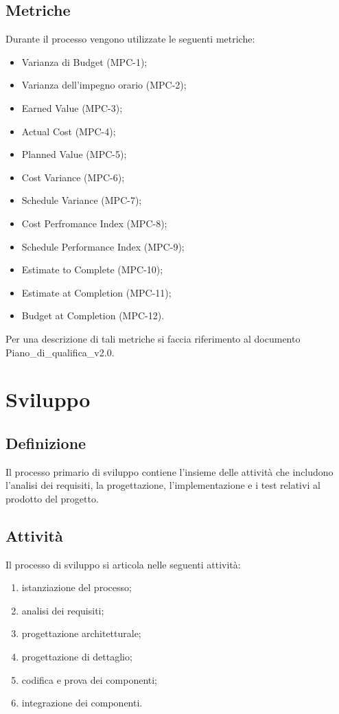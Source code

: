 \subsection{Metriche}
Durante il processo vengono utilizzate le seguenti metriche:
\begin{itemize}
    \item Varianza di Budget (MPC-1);
    \item Varianza dell'impegno orario (MPC-2);
    \item Earned Value (MPC-3);
    \item Actual Cost (MPC-4);
    \item Planned Value (MPC-5);
    \item Cost Variance (MPC-6);
    \item Schedule Variance (MPC-7);
    \item Cost Perfromance Index (MPC-8);
    \item Schedule Performance Index (MPC-9);
    \item Estimate to Complete (MPC-10);
    \item Estimate at Completion (MPC-11);
    \item Budget at Completion (MPC-12).
\end{itemize}
Per una descrizione di tali metriche si faccia riferimento al documento Piano\_di\_qualifica\_v2.0.

\newpage

\section{Sviluppo} \label{sec:sviluppo}
\subsection{Definizione}
Il processo primario di sviluppo contiene l'insieme delle attività che includono l'analisi dei requisiti, la progettazione, l'implementazione e i test relativi al prodotto del progetto.

\subsection{Attività}
Il processo di sviluppo si articola nelle seguenti attività:
\begin{enumerate}
    \item istanziazione del processo;
    \item analisi dei requisiti;
    \item progettazione architetturale;
    \item progettazione di dettaglio;
    \item codifica e prova dei componenti;
    \item integrazione dei componenti.
\end{enumerate}
